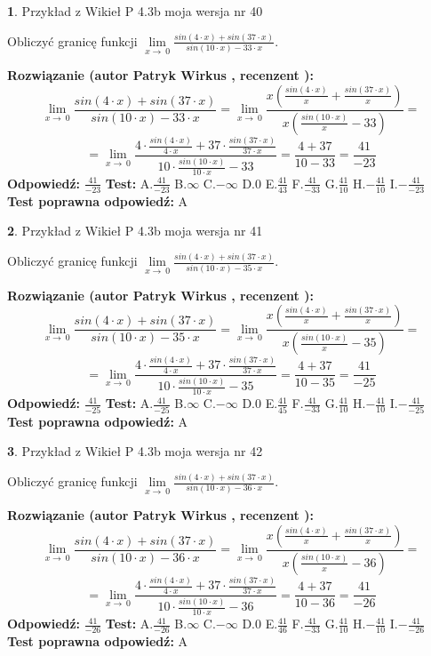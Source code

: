 \documentclass[12pt, a4paper]{article}
\theoremstyle{definition} %
\newtheorem{zad}{}
\newcommand{\zadStart}[1]{\begin{zad}#1\newline}
\newcommand{\zadStop}{\end{zad}}
\newcommand{\rozwStart}[2]{\noindent \textbf{Rozwiązanie (autor #1 , recenzent #2): }\newline}
\newcommand{\rozwStop}{\newline}
\newcommand{\odpStart}{\noindent \textbf{Odpowiedź:}\newline}
\newcommand{\odpStop}{\newline}
\newcommand{\testStart}{\noindent \textbf{Test:}\newline}
\newcommand{\testStop}{\newline}
\newcommand{\kluczStart}{\noindent \textbf{Test poprawna odpowiedź:}\newline}
\newcommand{\kluczStop}{\newline}
\begin{document}
\zadStart{Przykład z Wikieł P 4.3b moja wersja nr 40}


Obliczyć granicę funkcji $\lim\limits_{x\to\ 0}\frac{sin(4 \cdot x)+sin(37 \cdot x)}{sin(10 \cdot x)-33 \cdot x}$.
\zadStop
\rozwStart{Patryk Wirkus}{}
$$\lim\limits_{x\to\ 0}\frac{sin(4 \cdot x)+sin(37 \cdot x)}{sin(10 \cdot x)-33 \cdot x}=\lim\limits_{x\to\ 0}\frac{x(\frac{sin(4 \cdot x)}{x}+\frac{sin(37 \cdot x)}{x})}{x(\frac{sin(10 \cdot x)}{x}-33)}=$$
$$=\lim\limits_{x\to\ 0}\frac{4 \cdot \frac{sin(4 \cdot x)}{4 \cdot x}+37 \cdot \frac{sin(37 \cdot x)}{37 \cdot x}}{10 \cdot \frac{sin(10 \cdot x)}{10 \cdot x}-33}=\frac{4+37}{10-33} = \frac{41}{-23}$$
\rozwStop
\odpStart
$\frac{41}{-23}$
\odpStop
\testStart
A.$\frac{41}{-23}$
B.$\infty$
C.$-\infty$
D.$0$
E.$\frac{41}{43}$
F.$\frac{41}{-33}$
G.$\frac{41}{10}$
H.$-\frac{41}{10}$
I.$-\frac{41}{-23}$
\testStop
\kluczStart
A
\kluczStop



\zadStart{Przykład z Wikieł P 4.3b moja wersja nr 41}


Obliczyć granicę funkcji $\lim\limits_{x\to\ 0}\frac{sin(4 \cdot x)+sin(37 \cdot x)}{sin(10 \cdot x)-35 \cdot x}$.
\zadStop
\rozwStart{Patryk Wirkus}{}
$$\lim\limits_{x\to\ 0}\frac{sin(4 \cdot x)+sin(37 \cdot x)}{sin(10 \cdot x)-35 \cdot x}=\lim\limits_{x\to\ 0}\frac{x(\frac{sin(4 \cdot x)}{x}+\frac{sin(37 \cdot x)}{x})}{x(\frac{sin(10 \cdot x)}{x}-35)}=$$
$$=\lim\limits_{x\to\ 0}\frac{4 \cdot \frac{sin(4 \cdot x)}{4 \cdot x}+37 \cdot \frac{sin(37 \cdot x)}{37 \cdot x}}{10 \cdot \frac{sin(10 \cdot x)}{10 \cdot x}-35}=\frac{4+37}{10-35} = \frac{41}{-25}$$
\rozwStop
\odpStart
$\frac{41}{-25}$
\odpStop
\testStart
A.$\frac{41}{-25}$
B.$\infty$
C.$-\infty$
D.$0$
E.$\frac{41}{45}$
F.$\frac{41}{-33}$
G.$\frac{41}{10}$
H.$-\frac{41}{10}$
I.$-\frac{41}{-25}$
\testStop
\kluczStart
A
\kluczStop



\zadStart{Przykład z Wikieł P 4.3b moja wersja nr 42}


Obliczyć granicę funkcji $\lim\limits_{x\to\ 0}\frac{sin(4 \cdot x)+sin(37 \cdot x)}{sin(10 \cdot x)-36 \cdot x}$.
\zadStop
\rozwStart{Patryk Wirkus}{}
$$\lim\limits_{x\to\ 0}\frac{sin(4 \cdot x)+sin(37 \cdot x)}{sin(10 \cdot x)-36 \cdot x}=\lim\limits_{x\to\ 0}\frac{x(\frac{sin(4 \cdot x)}{x}+\frac{sin(37 \cdot x)}{x})}{x(\frac{sin(10 \cdot x)}{x}-36)}=$$
$$=\lim\limits_{x\to\ 0}\frac{4 \cdot \frac{sin(4 \cdot x)}{4 \cdot x}+37 \cdot \frac{sin(37 \cdot x)}{37 \cdot x}}{10 \cdot \frac{sin(10 \cdot x)}{10 \cdot x}-36}=\frac{4+37}{10-36} = \frac{41}{-26}$$
\rozwStop
\odpStart
$\frac{41}{-26}$
\odpStop
\testStart
A.$\frac{41}{-26}$
B.$\infty$
C.$-\infty$
D.$0$
E.$\frac{41}{46}$
F.$\frac{41}{-33}$
G.$\frac{41}{10}$
H.$-\frac{41}{10}$
I.$-\frac{41}{-26}$
\testStop
\kluczStart
A
\kluczStop
\end{document}
